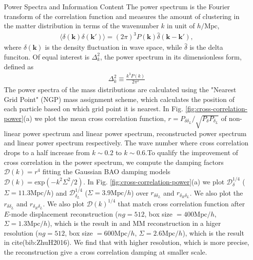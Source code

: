 \begin{section}{Power Spectra and Information Content}
  \label{sec:fisherinfo}
    The power spectrum is the Fourier transform of the correlation function and measures
 the amount of clustering in the matter distribution in terms of the wavenumber
 $k$ in unit of $h/\mathrm{Mpc}$,
\begin{align}
    \langle \delta \left( \bm{k} \right) \delta \left( \bm{k'}\right) \rangle =
\left( 2\pi \right) ^3 P \left( \bm{k} \right) \hat{\delta} \left( \bm{k}-\bm{k'} \right),
\end{align}
where $\delta \left( \bm{k} \right)$ is the density fluctuation in wave space, while 
$\hat{\delta}$ is the delta funciton. Of equal interest is $\Delta ^2_k$, the power 
spectrum in its dimensionless form, defined as
\begin{align}
    \Delta ^2_k \equiv \frac{k^3 P \left( k \right)}{2\pi ^2}
\end{align}
    The power spectra of the mass distributions are calculated using the "Nearest Grid Point" 
(NGP) mass assignment scheme, which calculates the position of each particle based on which 
grid point it is nearest. In Fig. \ref{fig:cross-correlation-power}(a) we plot the mean cross correlation 
function, $r=P_{\delta \delta_L}/\sqrt{P_\delta P_{\delta_L}}$ of non-linear power spectrum and 
linear power spectrum, reconstructed power spectrum and 
linear power spectrum respectively. The wave number where cross correlation drops to a half increase 
from $k\sim 0.2$ to $k \sim 0.6$.To qualify the improvement of cross correlation in the 
power spectrum, we compute the damping factors $\mathcal{D}(k)=r^4$ fitting the Gaussian BAO damping models 
$\mathcal{D}(k)=\mathrm{exp}(-k^2 \Sigma^2/2)$. In Fig. \ref{fig:cross-correlation-power}(a) 
we plot $\mathcal{D}_\delta^{1/4}$ ($\Sigma = 11.3 \mathrm{Mpc}/h$) and $\mathcal{D}_{\delta_L}^{1/4}$ 
($\Sigma = 3.9 \mathrm{Mpc}/h$) over $r_{\delta\delta_L}$ and $r_{\delta_R\delta_L}$. 
We also plot the $r_{\delta\delta_L}$ and $r_{\delta_R\delta_L}$. We also plot $\mathcal{D}(k)^{1/4}$ 
that match cross correlation function after $E$-mode displacement 
reconstruction ($ng=512$, box size $=400 \mathrm{Mpc}/h$, $\Sigma = 1.3 \mathrm{Mpc}/h$), 
which is the result in \cite{bib:Yu2016} and 
MM reconstruction in a higer resolution ($ng=512$, box size $=600 \mathrm{Mpc}/h$, $\Sigma = 2.6 \mathrm{Mpc}/h$), 
which is the result in cite(bib:ZhuH2016). We find that with higher resolution, which is more precise, 
the reconstruction give a cross correlation damping at smaller scale. 

\end{section}
